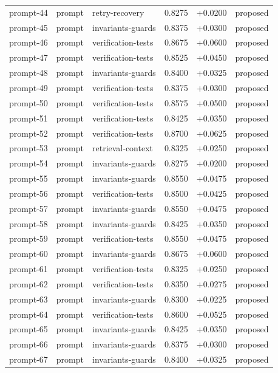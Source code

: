 \begin{center}
\begin{longtable}{llp{5.2cm}rrl}
prompt-44 & prompt & retry-recovery & 0.8275 & +0.0200 & proposed \\
prompt-45 & prompt & invariants-guards & 0.8375 & +0.0300 & proposed \\
prompt-46 & prompt & verification-tests & 0.8675 & +0.0600 & proposed \\
prompt-47 & prompt & verification-tests & 0.8525 & +0.0450 & proposed \\
prompt-48 & prompt & invariants-guards & 0.8400 & +0.0325 & proposed \\
prompt-49 & prompt & verification-tests & 0.8375 & +0.0300 & proposed \\
prompt-50 & prompt & verification-tests & 0.8575 & +0.0500 & proposed \\
prompt-51 & prompt & verification-tests & 0.8425 & +0.0350 & proposed \\
prompt-52 & prompt & verification-tests & 0.8700 & +0.0625 & proposed \\
prompt-53 & prompt & retrieval-context & 0.8325 & +0.0250 & proposed \\
prompt-54 & prompt & invariants-guards & 0.8275 & +0.0200 & proposed \\
prompt-55 & prompt & invariants-guards & 0.8550 & +0.0475 & proposed \\
prompt-56 & prompt & verification-tests & 0.8500 & +0.0425 & proposed \\
prompt-57 & prompt & invariants-guards & 0.8550 & +0.0475 & proposed \\
prompt-58 & prompt & invariants-guards & 0.8425 & +0.0350 & proposed \\
prompt-59 & prompt & verification-tests & 0.8550 & +0.0475 & proposed \\
prompt-60 & prompt & invariants-guards & 0.8675 & +0.0600 & proposed \\
prompt-61 & prompt & verification-tests & 0.8325 & +0.0250 & proposed \\
prompt-62 & prompt & verification-tests & 0.8350 & +0.0275 & proposed \\
prompt-63 & prompt & invariants-guards & 0.8300 & +0.0225 & proposed \\
prompt-64 & prompt & verification-tests & 0.8600 & +0.0525 & proposed \\
prompt-65 & prompt & invariants-guards & 0.8425 & +0.0350 & proposed \\
prompt-66 & prompt & invariants-guards & 0.8375 & +0.0300 & proposed \\
prompt-67 & prompt & invariants-guards & 0.8400 & +0.0325 & proposed \\

\end{longtable}
\end{center}
